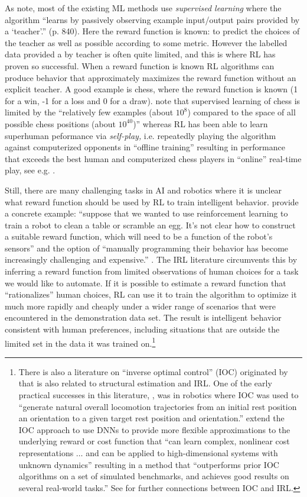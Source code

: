 As \citet{RussellNorvig:2022} note, most of the existing ML methods use {\it supervised learning\/} where the algorithm
``learns by passively observing example input/output pairs provided by a `teacher'.'' (p. 840). Here the reward function is known:
to predict the choices of the teacher as well as possible according to some metric. However the labelled data provided a by teacher
is often quite limited, and this is where RL has proven so successful. When a reward function is known
RL algorithms can produce behavior that approximately maximizes the reward function 
without an explicit teacher. A good example is chess, where  the reward function is known (1 for a win, -1 for a loss
and 0 for a draw).  \citet{RussellNorvig:2022} note that supervised learning of chess is limited by the 
``relatively few examples (about $10^8$) compared to the space of all possible
chess positions (about $10^{40}$)'' whereas RL has been able to learn superhuman peformance 
via  {\it self-play,\/} i.e. repeatedly playing the algorithm against computerized opponents in
``offline training'' resulting in performance that exceeds the best human and computerized chess players 
in ``online'' real-time play, see e.g. \citet{Silver:2018}.   

Still, there are many challenging tasks in AI and robotics where it is unclear what reward function should be 
used by RL to train intelligent behavior.  \citet{christiano:2017} provide a concrete example:  
``suppose that we wanted to use reinforcement learning to train a robot to clean a table or scramble an egg. It's not clear how to construct a suitable reward function, which will need to be a function of the robot's sensors'' and the option of ``manually programming their behavior has become increasingly challenging and expensive.'' \citet{Osa:2018}. 
The IRL literature circumvents this by inferring a reward function from limited observations of human choices 
for a task we would like to automate. If it is possible to estimate 
a reward function that ``rationalizes'' human choices,  RL can use it 
to train the algorithm to optimize it much more rapidly and cheaply under a wider range of scenarios
that were encountered in the demonstration data set. The result is intelligent  behavior 
consistent with human preferences, including situations that are outside 
the limited set in the data it was trained on.\footnote{\footnotesize There is also a literature
on ``inverse optimal control'' (IOC) originated by \citet{kalman:1964} that is also related to structural estimation and IRL.  One of the early
practical successes in this literature, \citet{locomotion:2010}, was in robotics where IOC was used to ``generate natural overall locomotion trajectories from an initial rest position an orientation to a given target rest position and orientation.''
\citet{guidedcostlearning:2016} extend the IOC approach to use DNNs to provide more flexible approximations to the
underlying reward or cost function  that ``can learn complex, nonlinear cost representations $\ldots$ and can be applied to high-dimensional systems with unknown dynamics'' resulting in a method that ``outperforms prior IOC algorithms on a set of simulated benchmarks, and achieves good results on several real-world tasks.'' See \citet{azar:2020} for further connections between IOC and IRL.}

